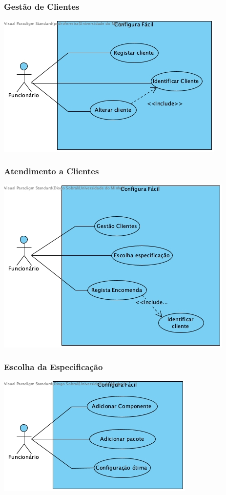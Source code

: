 \subsubsection{Gestão de Clientes}
		\begin{center}
 			\includegraphics[scale = 0.7]{D_USECASE/Gestao_de_clientes.jpg}
		\end{center}
\subsubsection{Atendimento a Clientes}
		\begin{center}
 			\includegraphics[scale = 0.7]{D_USECASE/Atendimento_a_clientes.jpg}
		\end{center}\newpage
\subsubsection{Escolha da Especificação}
		\begin{center}
 			\includegraphics[scale = 0.7]{D_USECASE/Escolha_da_especificacao.jpg}
		\end{center}
